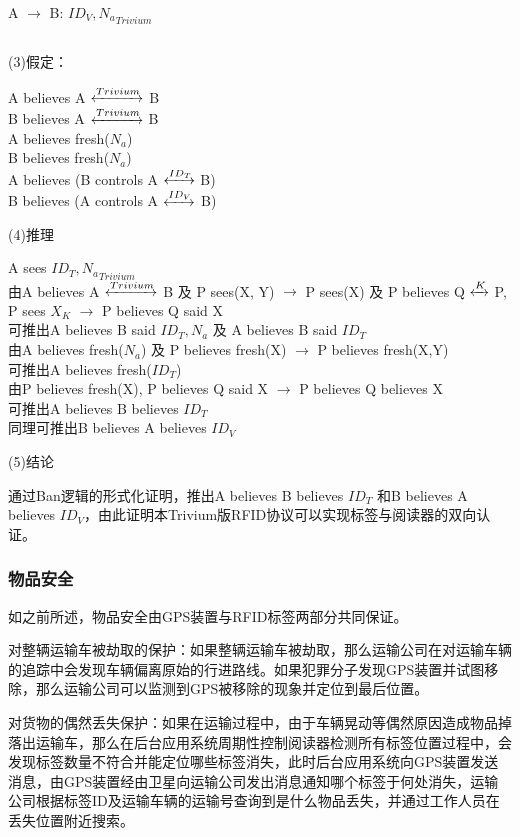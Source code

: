 A $\rightarrow$ B: ${ID_{V}, N_{a}}_{Trivium}$

\[\]

(3)假定：

A believes A $\xleftrightarrow{Trivium}$ B \\
B believes A $\xleftrightarrow{Trivium}$ B \\
A believes fresh($N_{a}$) \\
B believes fresh($N_{a}$) \\
A believes (B controls A $\xleftrightarrow{ID_{T}}$ B) \\
B believes (A controls A $\xleftrightarrow{ID_{V}}$ B) \\

\[\]

(4)推理

A sees ${ID_{T}, N_{a}}_{Trivium}$ \\
由A believes A $\xleftrightarrow{Trivium}$ B 及 P sees(X, Y) $\rightarrow$ P sees(X) 及 P believes Q $\xleftrightarrow{K}$ P, P sees ${X}_{K}$ $\rightarrow$ P believes Q said X \\
可推出A believes B said {$ID_{T}, N_{a}$} 及 A believes B said $ID_{T}$\\
由A believes fresh($N_{a}$) 及 P believes fresh(X) $\rightarrow$ P believes fresh(X,Y) \\
可推出A believes fresh($ID_{T}$)\\
由P believes fresh(X), P believes Q said X $\rightarrow$ P believes Q believes X \\
可推出A believes B believes $ID_{T}$ \\
同理可推出B believes A believes $ID_{V}$

(5)结论

通过Ban逻辑的形式化证明，推出A believes B believes $ID_{T}$ 和B believes A believes $ID_{V}$，由此证明本Trivium版RFID协议可以实现标签与阅读器的双向认证。



\subsubsection{物品安全}

如之前所述，物品安全由GPS装置与RFID标签两部分共同保证。

对整辆运输车被劫取的保护：如果整辆运输车被劫取，那么运输公司在对运输车辆的追踪中会发现车辆偏离原始的行进路线。如果犯罪分子发现GPS装置并试图移除，那么运输公司可以监测到GPS被移除的现象并定位到最后位置。

对货物的偶然丢失保护：如果在运输过程中，由于车辆晃动等偶然原因造成物品掉落出运输车，那么在后台应用系统周期性控制阅读器检测所有标签位置过程中，会发现标签数量不符合并能定位哪些标签消失，此时后台应用系统向GPS装置发送消息，由GPS装置经由卫星向运输公司发出消息通知哪个标签于何处消失，运输公司根据标签ID及运输车辆的运输号查询到是什么物品丢失，并通过工作人员在丢失位置附近搜索。

